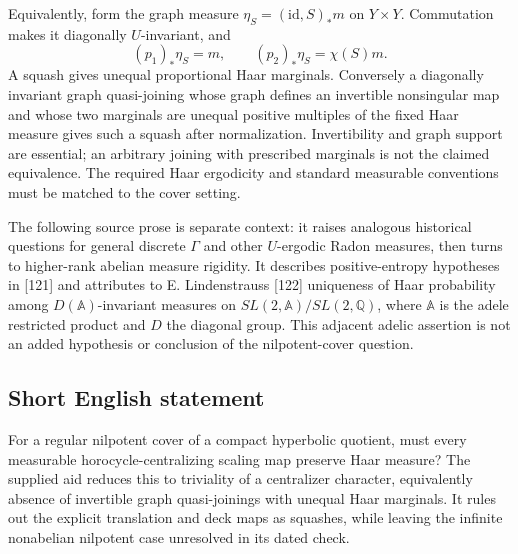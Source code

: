 \documentclass[11pt]{article}
\newcommand{\Q}{\mathbb{Q}}
\begin{document}
Equivalently, form the graph measure $\eta_S=(\mathrm{id},S)_*m$ on $Y\times Y$. Commutation makes it diagonally $U$-invariant, and
\[
 (p_1)_*\eta_S=m,\qquad(p_2)_*\eta_S=\chi(S)m.
\]
A squash gives unequal proportional Haar marginals. Conversely a diagonally invariant graph quasi-joining whose graph defines an invertible nonsingular map and whose two marginals are unequal positive multiples of the fixed Haar measure gives such a squash after normalization. Invertibility and graph support are essential; an arbitrary joining with prescribed marginals is not the claimed equivalence. The required Haar ergodicity and standard measurable conventions must be matched to the cover setting.

The following source prose is separate context: it raises analogous historical questions for general discrete $\Gamma$ and other $U$-ergodic Radon measures, then turns to higher-rank abelian measure rigidity. It describes positive-entropy hypotheses in [121] and attributes to E. Lindenstrauss [122] uniqueness of Haar probability among $D(\mathbb A)$-invariant measures on $SL(2,\mathbb A)/SL(2,\Q)$, where $\mathbb A$ is the adele restricted product and $D$ the diagonal group. This adjacent adelic assertion is not an added hypothesis or conclusion of the nilpotent-cover question.
\subsection{Short English statement}
For a regular nilpotent cover of a compact hyperbolic quotient, must every measurable horocycle-centralizing scaling map preserve Haar measure? The supplied aid reduces this to triviality of a centralizer character, equivalently absence of invertible graph quasi-joinings with unequal Haar marginals. It rules out the explicit translation and deck maps as squashes, while leaving the infinite nonabelian nilpotent case unresolved in its dated check.
\end{document}
